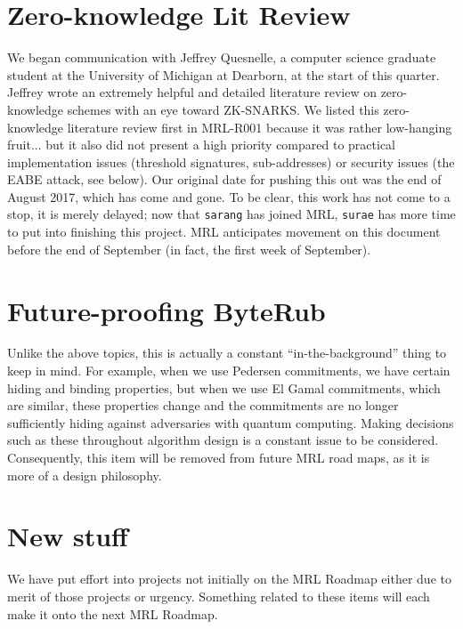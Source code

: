 \documentclass[12pt,english]{mrl}
\theoremstyle{definition}
\numberwithin{equation}{section}
\numberwithin{figure}{section}
\numberwithin{equation}{section}
\numberwithin{equation}{section}
\numberwithin{figure}{section}
\begin{document}
    
\section{Zero-knowledge Lit Review} 

We began communication with Jeffrey Quesnelle, a computer science graduate student at the University of Michigan at Dearborn, at the start of this quarter. Jeffrey wrote an extremely helpful and detailed literature review on zero-knowledge schemes with an eye toward ZK-SNARKS. We listed this zero-knowledge literature review first in MRL-R001 because it was rather low-hanging fruit... but it also did not present a high priority compared to practical implementation issues (threshold signatures, sub-addresses) or security issues (the EABE attack, see below). Our original date for pushing this out was the end of August 2017, which has come and gone. To be clear, this work has not come to a stop, it is merely delayed; now that \texttt{sarang} has joined MRL, \texttt{surae} has more time to put into finishing this project. MRL anticipates movement on this document before the end of September (in fact, the first week of September).
    
    
\section{Future-proofing ByteRub} 

Unlike the above topics, this is actually a constant ``in-the-background'' thing to keep in mind. For example, when we use Pedersen commitments, we have certain hiding and binding properties, but when we use El Gamal commitments, which are similar, these properties change and the commitments are no longer sufficiently hiding against adversaries with quantum computing. Making decisions such as these throughout algorithm design is a constant issue to be considered. Consequently, this item will be removed from future MRL road maps, as it is more of a design philosophy.
    
\section{New stuff}

We have put effort into projects not initially on the MRL Roadmap either due to merit of those projects or urgency. Something related to these items will each make it onto the next MRL Roadmap.
\end{document}
